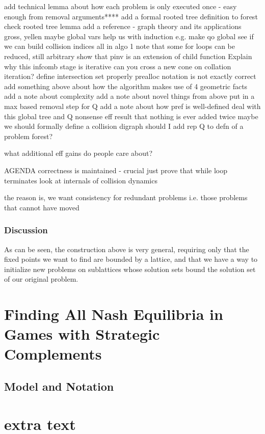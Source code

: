 \documentclass[11pt,reqno]{amsart}
\theoremstyle{definition}
\numberwithin{equation}{section}
\begin{document}
\begin{enumerate}
add technical lemma about how each problem is only executed once - easy enough from removal arguments****
add a formal rooted tree definition to forest 
check rooted tree lemma 
add a reference - graph theory and its applications gross, yellen
maybe global vars help us with induction e.g. make qo global 
see if we can build collision indices all in algo 1 
note that some for loops can be reduced, still arbitrary
show that pinv is an extension of child function 
Explain why this infcomb stage is iterative 
can you cross a new cone on collation iteration? 
define intersection set properly
prealloc notation is not exactly correct
add something above about how the algorithm makes use of 4 geometric facts 
add a note about complexity 
add a note about novel things from above
put in a max based removal step for Q
add a note about how pref is well-defined 
deal with this global tree and Q nonsense
eff result that nothing is ever added twice
maybe we should formally define a collision digraph 
should I add rep Q to defn of a problem forest? 

what additional eff gains do people care about? 

AGENDA
correctness is maintained - crucial 
just prove that while loop terminates 
look at internals of collision dynamics

the reason is, we want consistency for redundant problems i.e. those problems that cannot have moved 

\subsubsection{Discussion}
As can be seen, the construction above is very general, requiring only that the fixed points we want to find are bounded by a lattice, and that we have a way to initialize new problems on sublattices whose solution sets bound the solution set of our original problem. 

\section{Finding All Nash Equilibria in Games with Strategic Complements}
\subsection{Model and Notation}





\section{extra text} 


\end{enumerate}
\end{document}
